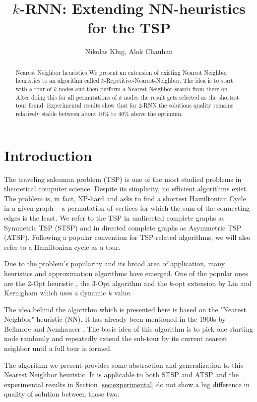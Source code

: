 \documentclass[11pt]{article}
\title{$k$-RNN: Extending NN-heuristics for the TSP}
\author{Nikolas Klug, Alok Chauhan}
\begin{document}
	\maketitle
	\begin{abstract}
		Nearest Neighbor heuristics
		We present an extension of existing Nearest Neighbor heuristics to an algorithm called $k$-Repetitive-Nearest-Neighbor. 
		The idea is to start with a tour of $k$ nodes and then perform a Nearest Neighbor search from there on. 
		After doing this for all permutations of $k$ nodes the result gets selected as the shortest tour found. 
		Experimental results show that for $2$-RNN the solutions quality remains relatively stable between about $10\%$ to $40\%$ above the optimum.
	\end{abstract}

	\section{Introduction}
	\label{sec:introduction}
	The traveling salesman problem (TSP) is one of the most studied problems in theoretical computer science. 
	Despite its simplicity, no efficient algorithms exist. 
	The problem is, in fact, NP-hard and asks to find a shortest Hamiltonian Cycle in a given graph -- a permutation of vertices for which the sum of the connecting edges is the least.
	We refer to the TSP in undirected complete graphs as Symmetric TSP (STSP) and in directed complete graphs as Asymmetric TSP (ATSP).
	Following a popular convention for TSP-related algorithms, we will also refer to a Hamiltonian cycle as a tour. 	

	Due to the problem's popularity and its broad area of application, many heuristics and approximation algorithms have emerged. One of the popular ones are the $2$-Opt heuristic \cite{CROES1958}, the $3$-Opt algorithm \cite{LIN1965} and the $k$-opt extension by Lin and Kernigham \cite{LIN1973} which uses a dynamic $k$ value.
	
	The idea behind the algorithm which is presented here is based on the "Nearest Neighbor" heuristic (NN).
	It has already been mentioned in the 1960s by Bellmore and Nemhauser \cite{BELLMORE1968}.
	The basic idea of this algorithm is to pick one starting node randomly and repeatedly extend the sub-tour by its current nearest neighbor until a full tour is formed.
	
	The algorithm we present provides some abstraction and generalization to this Nearest Neighbor heuristic. 
	It is applicable to both STSP and ATSP and the experimental results in Section \ref{sec:experimental} do not show a big difference in quality of solution between those two.
	
\end{document}
